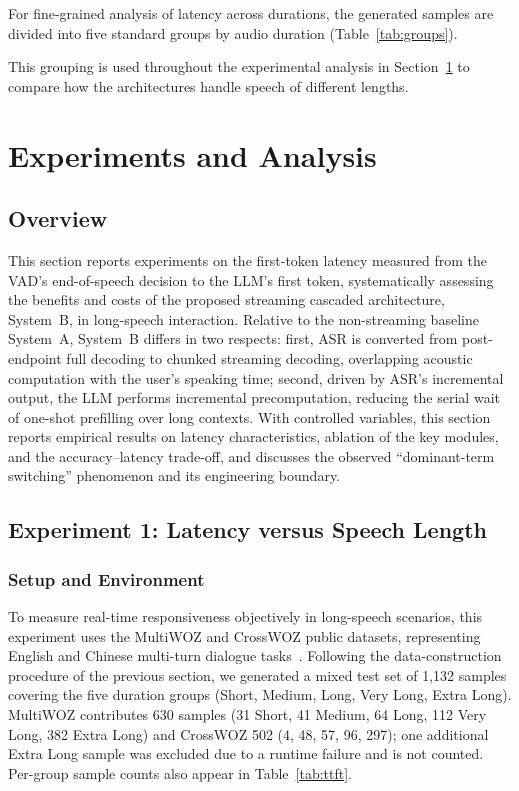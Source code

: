\documentclass[conference]{IEEEtran}
\begin{document}
For fine-grained analysis of latency across durations, the generated samples are divided into five standard groups by audio duration (Table~\ref{tab:groups}).

This grouping is used throughout the experimental analysis in Section~\ref{sec:experiments} to compare how the architectures handle speech of different lengths.

\section{Experiments and Analysis}\label{sec:experiments}

\subsection{Overview}

This section reports experiments on the first-token latency measured from the VAD's end-of-speech decision to the LLM's first token, systematically assessing the benefits and costs of the proposed streaming cascaded architecture, System~B, in long-speech interaction. Relative to the non-streaming baseline System~A, System~B differs in two respects: first, ASR is converted from post-endpoint full decoding to chunked streaming decoding, overlapping acoustic computation with the user's speaking time; second, driven by ASR's incremental output, the LLM performs incremental precomputation, reducing the serial wait of one-shot prefilling over long contexts. With controlled variables, this section reports empirical results on latency characteristics, ablation of the key modules, and the accuracy--latency trade-off, and discusses the observed ``dominant-term switching'' phenomenon and its engineering boundary.

\subsection{Experiment 1: Latency versus Speech Length}

\subsubsection{Setup and Environment}

To measure real-time responsiveness objectively in long-speech scenarios, this experiment uses the MultiWOZ and CrossWOZ public datasets, representing English and Chinese multi-turn dialogue tasks~\cite{ref18,ref19}. Following the data-construction procedure of the previous section, we generated a mixed test set of 1,132 samples covering the five duration groups (Short, Medium, Long, Very Long, Extra Long). MultiWOZ contributes 630 samples (31 Short, 41 Medium, 64 Long, 112 Very Long, 382 Extra Long) and CrossWOZ 502 (4, 48, 57, 96, 297); one additional Extra Long sample was excluded due to a runtime failure and is not counted. Per-group sample counts also appear in Table~\ref{tab:ttft}.
\end{document}
